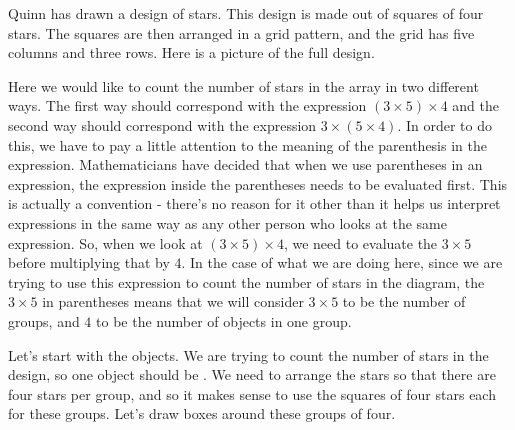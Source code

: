 \documentclass{ximera}
\begin{document}
\begin{example}
Quinn has drawn a design of stars. This design is made out of squares of four stars. The squares are then arranged in a grid pattern, and the grid has five columns and three rows. Here is a picture of the full design.
\begin{center}
\end{center}

Here we would like to count the number of stars in the array in two different ways. The first way should correspond with the expression $(3 \times 5) \times 4$ and the second way should correspond with the expression $3 \times (5 \times 4)$. In order to do this, we have to pay a little attention to the meaning of the parenthesis in the expression. Mathematicians have decided that when we use parentheses in an expression, the expression inside the parentheses needs to be evaluated first. This is actually a convention - there's no reason for it other than it helps us interpret expressions in the same way as any other person who looks at the same expression. So, when we look at $(3 \times 5) \times 4$, we need to evaluate the $3 \times 5$ before multiplying that by $4$. In the case of what we are doing here, since we are trying to use this expression to count the number of stars in the diagram, the $3 \times 5$ in parentheses means that we will consider $3 \times 5$ to be the number of groups, and $4$ to be the number of objects in one group. 

Let's start with the objects. We are trying to count the number of stars in the design, so one object should be . We need to arrange the stars so that there are four stars per group, and so it makes sense to use the squares of four stars each for these groups. Let's draw boxes around these groups of four.
\begin{center}
\end{center}


\end{example}
\end{document}

